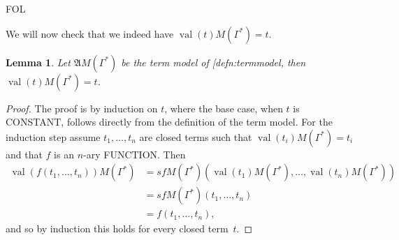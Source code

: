 \documentclass[10pt,a4paper]{article}
\makeatletter
\newcommand*{\olup}[1]{\MakeUppercase{#1}}
\theoremstyle{plain}
\newtheorem{lem}[thm]{Lemma}
\theoremstyle{definition}
\theoremstyle{remark}
\newcommand*{\ollabel}[1]{\label{#1}}
\newcommand{\olref}{\@ifnextchar[{\olref@i}{\olref@final}}
\def\olref@i[#1]{\@ifnextchar[{\olref@ii}{\olref@final}}
\def\olref@ii[#1]{\@ifnextchar[{\olref@iii}{\olref@final}}
\def\olref@iii[#1]{\olref@final}
\def\olref@final#1{\ref{#1}}
\providecommand{\Struct}{\ensuremath{\mathfrak{A}}}
\providecommand{\Assign}{\ensuremath{s}}
\providecommand{\iftag}[1]{#1}
\providecommand{\Value}[1]{\operatorname{val}(#1)}
\providecommand{\iftag}{}
\makeatother
\begin{document}
\iftag{FOL}{%
We will now check that we indeed have $\Value{t}{M(\Gamma^*)} = t$.

\begin{lem} 
\ollabel{lem:val-in-termmodel} Let $\Struct M(\Gamma^*)$ be the term model
of \olref{defn:termmodel}, then $\Value{t}{M(\Gamma^*)} = t$.
\end{lem}
\begin{proof} 
 The proof is by induction on $t$, where the base case, when $t$
 is \olup{constant}, follows directly from the definition of the term
 model. For the induction step assume $t_1, \ldots, t_n$ are closed terms
 such that $\Value{t_i}{M(\Gamma^*)} = t_i$ and that $f$ is an $n$-ary
 \olup{function}. Then 
\begin{align*}
\Value{f(t_1,\ldots,t_n)}{M(\Gamma^*)} &= \Assign{f}{M(\Gamma^*)}(\Value{t_1}
 {M(\Gamma^*)}, 
\ldots, \Value{t_n}{M(\Gamma^*)}) \\
&= \Assign{f}{M(\Gamma^*)}(t_1, \dots, t_n) \\
&= f(t_1,\dots, t_n),
\end{align*} 
and so by induction this holds for every closed term~$t$.
\end{proof}
}
\end{document}
